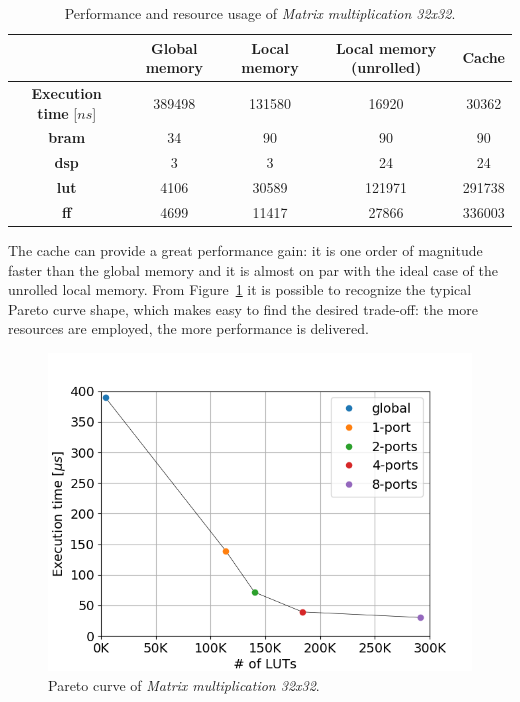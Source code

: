 \documentclass[11pt,a4paper,oneside]{memoir}
\begin{document}
\begin{table}[H]
	\begin{center}
		\begin{tabularx}{.8\textwidth}{CCCCC}
			\hline
			& \textbf{Global memory} & \textbf{Local memory} &
			\textbf{Local memory} (unrolled) & \textbf{Cache} \\
			\hline
			\textbf{Execution time} [$ns$] & 389498 & 131580 &
			16920 & 30362 \\
			\textbf{\ac{bram}} & 34 & 90 & 90 & 90 \\
			\textbf{\acs{dsp}} & 3 & 3 & 24 & 24 \\
			\textbf{\acs{lut}} & 4106 & 30589 & 121971 & 291738 \\
			\textbf{\acs{ff}} & 4699 & 11417 & 27866 & 336003 \\
			\hline
		\end{tabularx}
	\end{center}
	\caption{Performance and resource usage of \emph{Matrix multiplication
	32x32}.}
	\label{tab:matmul_32_report}
\end{table}

The cache can provide a great performance gain: it is one order of magnitude
faster than the global memory and it is almost on par with the ideal case of the
unrolled local memory.
From Figure~\ref{fig:matmul_32_pareto} it is possible to recognize the
typical Pareto curve shape, which makes easy to find the desired trade-off: the
more resources are employed, the more performance is delivered.

\begin{figure}[H]
	\centering
	\includegraphics[width=.8\textwidth]{matmul_32_multiport_pareto}
	\caption{Pareto curve of \emph{Matrix multiplication 32x32}.}
	\label{fig:matmul_32_pareto}
\end{figure}
\end{document}
